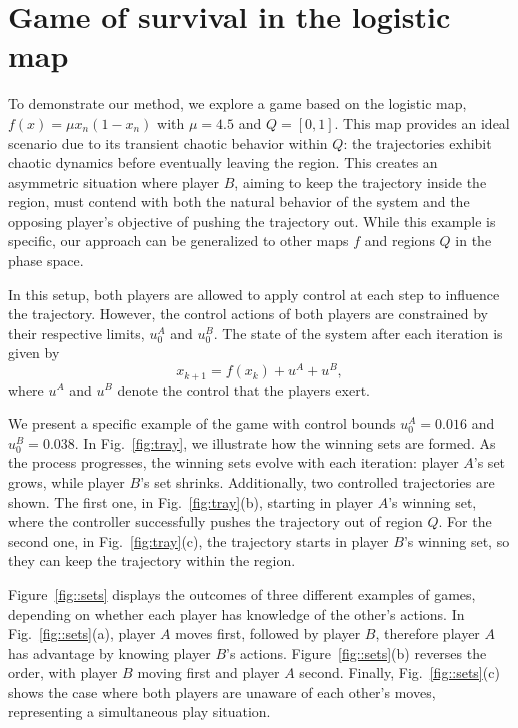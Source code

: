 \section{Game of survival in the logistic map}

To demonstrate our method, we explore a game based on the logistic map, \linebreak ${f(x) = \mu x_n(1-x_n)}$ with $\mu=4.5$ and $Q=[0,1]$. This map provides an ideal scenario due to its transient chaotic behavior within $Q$: the trajectories exhibit chaotic dynamics before eventually leaving the region. This creates an asymmetric situation where player $B$, aiming to keep the trajectory inside the region, must contend with both the natural behavior of the system and the opposing player’s objective of pushing the trajectory out. While this example is specific, our approach can be generalized to other maps $f$ and regions $Q$ in the phase space.

In this setup, both players are allowed to apply control at each step to influence the trajectory. However, the control actions of both players are constrained by their respective limits, $u_0^A$ and $u_0^B$. The state of the system after each iteration is given by
\begin{equation}
x_{k+1} = f(x_k) + u^A + u^B,
\end{equation}
where $u^A$ and $u^B$ denote the control that the players exert.

We present a specific example of the game with control bounds $u_0^A = 0.016$ and $u_0^B = 0.038$. In Fig.~\ref{fig:tray}, we illustrate how the winning sets are formed. As the process progresses, the winning sets evolve with each iteration: player $A$’s set grows, while player $B$’s set shrinks. Additionally, two controlled trajectories are shown. The first one, in Fig.~\ref{fig:tray}(b), starting in player $A$’s winning set, where the controller successfully pushes the trajectory out of region $Q$. For the second one, in Fig.~\ref{fig:tray}(c), the trajectory starts in player $B$’s winning set, so they can keep the trajectory within the region.

Figure~\ref{fig::sets} displays the outcomes of three different examples of games, depending on whether each player has knowledge of the other’s actions. In Fig.~\ref{fig::sets}(a), player $A$ moves first, followed by player $B$, therefore player $A$ has advantage by knowing player $B$'s actions. Figure~\ref{fig::sets}(b) reverses the order, with player $B$ moving first and player $A$ second. Finally, Fig.~\ref{fig::sets}(c) shows the case where both players are unaware of each other’s moves, representing a simultaneous play situation.

